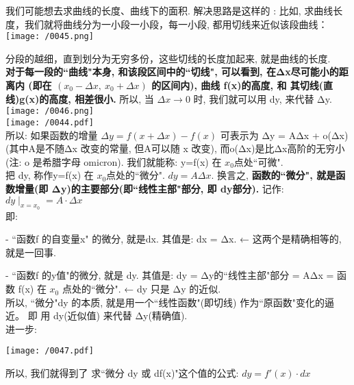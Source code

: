 \documentclass[UTF8]{ctexart}
\begin{document}
	
	我们可能想去求曲线的长度、曲线下的面积. 解决思路是这样的 : 比如, 求曲线长度，我们就将曲线分为一小段一小段，每一小段, 都用切线来近似该段曲线：\\
	
	\texttt{[image: /0045.png]}
	
	分段的越细，直到划分为无穷多份，这些切线的长度加起来, 就是曲线的长度. \\
	
	\textbf{对于每一段的``曲线"本身, 和该段区间中的``切线", 可以看到, 在Δx尽可能小的距离内 (即在 $\left( x_0-\varDelta x,\ x_0+\varDelta x \right) $ 的区间内), 曲线 f(x)的高度, 和 其切线(直线)g(x)的高度, 相差很小.} 所以, 当 $\varDelta x \rightarrow 0 $ 时, 我们就可以用 dy, 来代替 Δy. \\
	
	\texttt{[image: /0046.png]} \\
	
	\texttt{[image: /0044.pdf]} \\
	
	
	所以: 如果函数的增量 $\varDelta y=f\left( x+\varDelta x \right) -f\left( x \right) $ 可表示为 Δy = AΔx + o(Δx) (其中A是不随Δx 改变的常量, 但A可以随 x 改变), 而o(Δx)是比Δx高阶的无穷小 (注: o 是希腊字母 omicron). 我们就能称: y=f(x) 在 $x_0$点处``可微".  \\
	
	把 dy, 称作y=f(x) 在 $x_0$点处的``微分". $dy=A\varDelta x$. 换言之, \textbf{函数的``微分", 就是函数增量(即 Δy)的主要部分(即``线性主部"部分, 即 dy部分).}  记作: $dy\mid_{x=x_0}^{}=A\cdot \varDelta x$ \\

	即:
	
	- ``函数f 的自变量x" 的微分, 就是dx. 其值是: dx = Δx.  ← 这两个是精确相等的, 就是一回事.
	
	- ``函数f 的y值"的微分, 就是 dy. 其值是: dy = Δy的``线性主部"部分 = AΔx = 函数 f(x) 在 $x_0$ 点处的``微分".  ← dy 只是 Δy 的近似. \\
	
	所以, ``微分"dy 的本质, 就是用一个``线性函数"(即切线) 作为``原函数"变化的逼近。 即 用 dy(近似值) 来代替 Δy(精确值).  \\
	
	
	
	进一步:

	\texttt{[image: /0047.pdf]}
	
	所以, 我们就得到了 求``微分 dy 或 df(x)"这个值的公式: $ \boxed{ dy= f'(x) \cdot dx}$ \\
	
\end{document}
